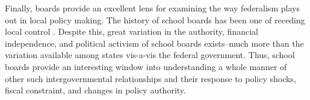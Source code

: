 Finally, boards provide an excellent lens for examining the way federalism plays out in local policy making. The history of school boards has been one of receding local control \citep{RefWorks:220}. Despite this, great variation in the authority, financial independence, and political activism of school boards exists--much more than the variation available among states vis-a-vis the federal government. Thus, school boards provide an interesting window into understanding a whole manner of other such intergovernmental relationships and their response to policy shocks, fiscal constraint, and changes in policy authority.


